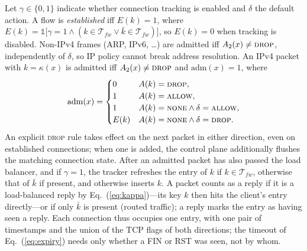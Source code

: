 \documentclass[conference]{IEEEtran}
\begin{document}
Let $\gamma\in\{0,1\}$ indicate whether connection tracking is enabled and
$\delta$ the default action. A flow is \emph{established} iff $E(k)=1$, where
$E(k) = \mathbb{1}\big[\gamma = 1 \land (k \in \mathcal{T}_{fw} \lor \bar k \in
\mathcal{T}_{fw})\big]$, so $E(k)=0$ when tracking is disabled. Non-IPv4
frames (ARP, IPv6, \dots) are admitted iff $A_2(x) \ne \textsc{drop}$,
independently of $\delta$, so IP policy cannot break address resolution. An
IPv4 packet with $k=\kappa(x)$ is admitted iff $A_2(x) \ne \textsc{drop}$ and
$\mathrm{adm}(x)=1$, where
\begin{equation}
\mathrm{adm}(x) =
\begin{cases}
0 & A(k) = \textsc{drop},\\
1 & A(k) = \textsc{allow},\\
1 & A(k) = \textsc{none} \land \delta=\textsc{allow},\\
E(k) & A(k) = \textsc{none} \land \delta = \textsc{drop}.
\end{cases}
\label{eq:adm}
\end{equation}
An explicit \textsc{drop} rule takes effect on the next packet in either
direction, even on established connections; when one is added, the control
plane additionally flushes the matching connection state. After an admitted
packet has also passed the load balancer, and if $\gamma=1$, the tracker
refreshes the entry of $k$ if $k\in\mathcal{T}_{fw}$, otherwise that of $\bar
k$ if present, and otherwise inserts $k$. A packet counts as a reply if it is
a load-balanced reply by Eq.~(\ref{eq:kappa})---its key $k$ then hits the
client's entry directly---or if only $\bar k$ is present (routed traffic);
a reply marks the entry as having seen a reply. Each connection thus occupies
one entry, with one pair of timestamps and the union of the TCP flags of both
directions; the timeout of Eq.~(\ref{eq:expiry}) needs only whether a FIN or
RST was seen, not by whom.
\end{document}
